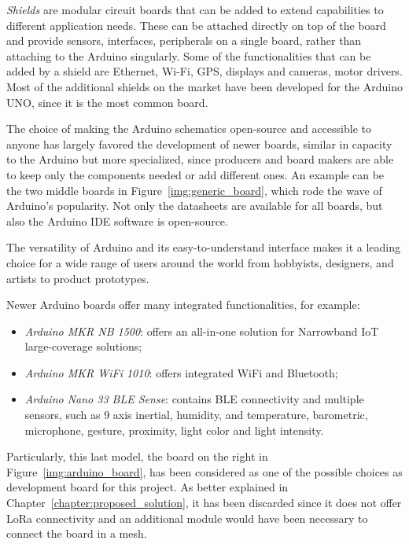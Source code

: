 			\textit{Shields} are modular circuit boards that can be added to extend capabilities to different application needs.
			These can be attached directly on top of the board and provide sensors, interfaces, peripherals on a single board, rather than attaching to the Arduino singularly.
			Some of the functionalities that can be added by a shield are Ethernet, Wi-Fi, GPS, displays and cameras, motor drivers.
			Most of the additional shields on the market have been developed for the Arduino UNO, since it is the most common board.
			
			The choice of making the Arduino schematics open-source and accessible to anyone has largely favored the development of newer boards, similar in capacity to the Arduino but more specialized, since producers and board makers are able to keep only the components needed or add different ones.
			An example can be the two middle boards in Figure~\ref{img:generic_board}, which rode the wave of Arduino's popularity.
			Not only the datasheets are available for all boards, but also the Arduino IDE software is open-source.
			
			The versatility of Arduino and its easy-to-understand interface makes it a leading choice for a wide range of users around the world from hobbyists, designers, and artists to product prototypes. 
			
			Newer Arduino boards offer many integrated functionalities, for example:
			\begin{itemize}
				\item \textit{Arduino MKR NB 1500}: offers an all-in-one solution for Narrowband IoT large-coverage solutions;
				\item \textit{Arduino MKR WiFi 1010}: offers integrated WiFi and Bluetooth;
				\item \textit{Arduino Nano 33 BLE Sense}: contains BLE connectivity and multiple sensors, such as 9 axis inertial, humidity, and temperature, barometric, microphone, gesture, proximity, light color and light intensity.
			\end{itemize}
		
			Particularly, this last model, the board on the right in Figure~\ref{img:arduino_board}, has been considered as one of the possible choices as development board for this project.
			As better explained in Chapter~\ref{chapter:proposed_solution}, it has been discarded since it does not offer LoRa connectivity and an additional module would have been necessary to connect the board in a mesh.
								
